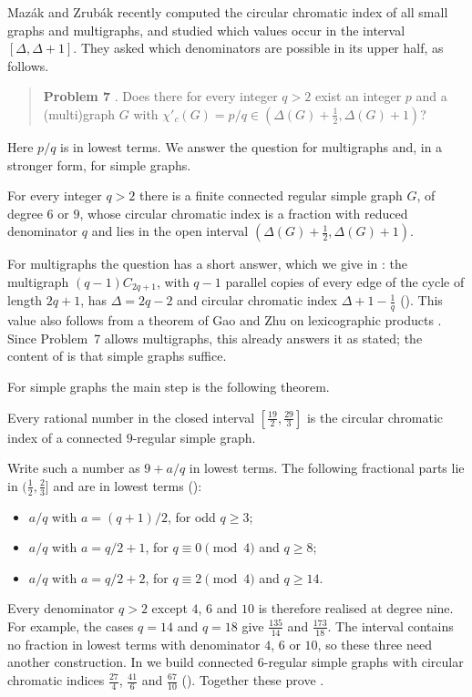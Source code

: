 \documentclass[11pt,colorlinks]{charlie}
\newcommand{\cind}{\chi'_c}
\begin{document}
Mazák and Zrubák \cite{MZ} recently computed the circular chromatic index of all small graphs and multigraphs, and studied which values occur in the interval $[\Delta,\Delta+1]$. They asked which denominators are possible in its upper half, as follows.

\begin{quote}
\textbf{Problem 7} \cite[Section~8]{MZ}. Does there for every integer $q>2$ exist an integer $p$ and a (multi)graph $G$ with $\cind(G)=p/q\in(\Delta(G)+\frac12,\Delta(G)+1)$?
\end{quote}

Here $p/q$ is in lowest terms. We answer the question for multigraphs and, in a stronger form, for simple graphs.

\begin{theorem}\label{thm:main}
For every integer $q>2$ there is a finite connected regular simple graph $G$, of degree $6$ or $9$, whose circular chromatic index is a fraction with reduced denominator $q$ and lies in the open interval $(\Delta(G)+\frac12,\Delta(G)+1)$.
\end{theorem}

For multigraphs the question has a short answer, which we give in : the multigraph $(q-1)C_{2q+1}$, with $q-1$ parallel copies of every edge of the cycle of length $2q+1$, has $\Delta=2q-2$ and circular chromatic index $\Delta+1-\frac1q$ (). This value also follows from a theorem of Gao and Zhu on lexicographic products \cite{GZ}. Since Problem~7 allows multigraphs, this already answers it as stated; the content of  is that simple graphs suffice.

For simple graphs the main step is the following theorem.

\begin{theorem}\label{thm:interval}
Every rational number in the closed interval $[\frac{19}{2},\frac{29}{3}]$ is the circular chromatic index of a connected $9$-regular simple graph.
\end{theorem}

Write such a number as $9+a/q$ in lowest terms. The following fractional parts lie in $(\frac12,\frac23]$ and are in lowest terms ():
\begin{itemize}
\item $a/q$ with $a=(q+1)/2$, for odd $q\ge3$;
\item $a/q$ with $a=q/2+1$, for $q\equiv0\pmod4$ and $q\ge8$;
\item $a/q$ with $a=q/2+2$, for $q\equiv2\pmod4$ and $q\ge14$.
\end{itemize}
Every denominator $q>2$ except $4$, $6$ and $10$ is therefore realised at degree nine. For example, the cases $q=14$ and $q=18$ give $\frac{135}{14}$ and $\frac{173}{18}$. The interval contains no fraction in lowest terms with denominator $4$, $6$ or $10$, so these three need another construction. In  we build connected $6$-regular simple graphs with circular chromatic indices $\frac{27}{4}$, $\frac{41}{6}$ and $\frac{67}{10}$ (). Together these prove .
\end{document}
